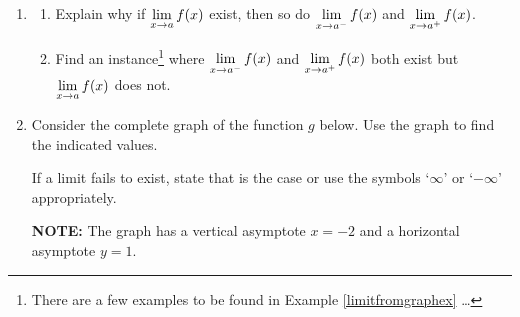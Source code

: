 \begin{enumerate}
\begin{multicols}{4}
\end{multicols}

\bigskip

\begin{multicols}{4}

\begin{itemize}

\item $\ds{\lim_{x \rightarrow 0} f(x)}$

\item  $f(0)$

\item $\ds{\lim_{x \rightarrow 3^{-}} f(x)}$

\item $\ds{\lim_{x \rightarrow 3^{+}} f(x)}$
\end{itemize}

\end{multicols}

\bigskip


\item\label{twosidedonesidedlimitexistexercise}  \begin{enumerate}  \item  Explain why if $\displaystyle{\lim_{x \rightarrow a} f(x)}$ exist, then so do $\displaystyle{\lim_{x \rightarrow a^{-}} f(x)}$ and $\displaystyle{\lim_{x \rightarrow a^{+}} f(x)}$.

\item   Find an instance\footnote{There are a few examples to be found in Example \ref{limitfromgraphex} \ldots}  where   $\displaystyle{\lim_{x \rightarrow a^{-}} f(x)}$ and $\displaystyle{\lim_{x \rightarrow a^{+}} f(x)}$ both exist but $\displaystyle{\lim_{x \rightarrow a} f(x)}$ does not.

\end{enumerate}

\item  Consider the complete graph of the function $g$ below.  Use the graph to find the indicated values.

\smallskip


If a limit fails to exist, state that is the case  or use the symbols `$\infty$' or `$-\infty$' appropriately.
  
\smallskip

 
 \textbf{NOTE:}  The graph has a vertical asymptote $x=-2$ and a horizontal asymptote $y = 1$.  



\begin{center}


\end{center}
\end{enumerate}
